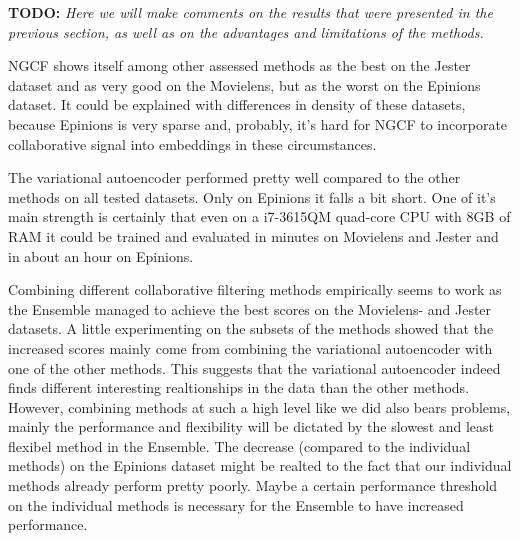 \textbf{TODO: }
\textit{Here we will make comments on the results that were presented in the previous section, as well as on the advantages and limitations of the methods.}



NGCF shows itself among other assessed methods as the best on the Jester dataset 
and as very good on the Movielens, but as the worst on the Epinions dataset.
It could be explained with differences in density of these datasets, because
Epinions is very sparse and, probably, it's hard for NGCF to incorporate 
collaborative signal into embeddings in these circumstances.

The variational autoencoder performed pretty well compared to the other methods on all tested datasets. Only on Epinions it falls a bit short. One of it's main strength is certainly that even on a i7-3615QM quad-core CPU with 8GB of RAM it could be trained and evaluated in minutes on Movielens and Jester and in about an hour on Epinions.


Combining different collaborative filtering methods empirically seems to work as the Ensemble managed to achieve the best scores on the Movielens- and Jester datasets. A little experimenting on the subsets of the methods showed that the increased scores mainly come from combining the variational autoencoder with one of the other methods. This suggests that the variational autoencoder indeed finds different interesting realtionships in the data than the other methods. However, combining methods at such a high level like we did also bears problems, mainly the performance and flexibility will be dictated by the slowest and least flexibel method in the Ensemble. The decrease (compared to the individual methods) on the Epinions dataset might be realted to the fact that our individual methods already perform pretty poorly. Maybe a certain performance threshold on the individual methods is necessary for the Ensemble to have increased performance.
